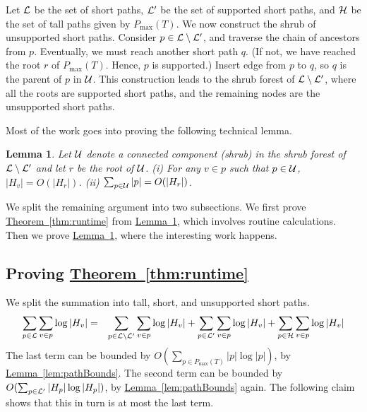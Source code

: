 \documentclass[11pt]{article}
\newtheorem{lemma}[theorem]{Lemma}
\theoremstyle{definition}
\newcommand{\cH}{{\cal H}}
\newcommand{\cL}{{\cal L}}
\newcommand{\cU}{{\cal U}}
\newcommand{\Thm}[1]{\hyperref[thm:#1]{Theorem~\ref*{thm:#1}}} %
\newcommand{\Lem}[1]{\hyperref[lem:#1]{Lemma~\ref*{lem:#1}}} %
\newcommand{\pmax}{P_{\max}}
\begin{document}
Let $\cL$ be the set of short paths, $\cL'$ be the set of supported short paths, and $\cH$ be the set of tall paths
given by $\pmax(T)$.
We now construct the shrub of unsupported short paths. Consider $p \in \cL \setminus \cL'$,
and traverse the chain of ancestors from $p$. Eventually, we must reach another short path $q$.
(If not, we have reached the root $r$ of $\pmax(T)$. Hence, $p$ is supported.)
Insert edge from $p$ to $q$, so $q$ is the parent of $p$ in $\cU$. This construction leads
to the shrub forest of $\cL \setminus \cL'$, where all the roots are supported short paths, 
and the remaining nodes are the unsupported short paths.

Most of the work goes into proving the following technical lemma.

\begin{lemma} \label{lem:cu-root} Let $\cU$ denote a connected component (shrub) in the shrub forest of $\cL \setminus \cL'$ and let $r$
be the root of $\cU$. (i) For any $v \in p$ such that $p \in \cU$,
$|H_v| = O(|H_r|)$. (ii) $\sum_{p \in \cU} |p| = O(|H_r|)$.
\end{lemma}

We split the remaining argument into two subsections. We first prove \Thm{runtime} from \Lem{cu-root},
which involves routine calculations. Then we prove \Lem{cu-root}, where the interesting work happens.


\subsection{Proving \Thm{runtime}} \label{sec:thm-runtime}

We split the summation into tall, short, and unsupported short paths.
\begin{eqnarray*} 
\sum_{p \in \cL} \sum_{v \in p} \log |H_v| & = & \sum_{p \in \cL \setminus \cL'} \sum_{v \in p} \log |H_v| + \sum_{p \in \cL'} \sum_{v \in p} \log |H_v| + \sum_{p \in \cH} \sum_{v \in p} \log |H_v|
\end{eqnarray*}
The last term can be bounded by $O(\sum_{p \in \pmax(T)} |p|\log |p|)$, by \Lem{pathBounds}.
The second term can be bounded by $O(\sum_{p \in \cL'} |H_p| \log |H_p|)$, by \Lem{pathBounds} again.
The following claim shows that this in turn is at most the last term.

\end{document}
